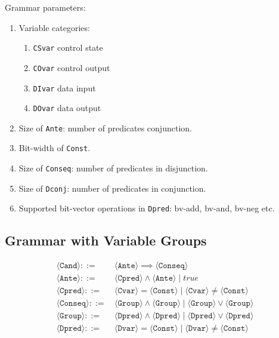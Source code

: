 \documentclass[10pt,conference]{article}
\numberwithin{equation}{section}
\newcommand{\tuple}[1]{\langle #1 \rangle}
\begin{document}
Grammar parameters:

\begin{enumerate}
\item Variable categories:
  \begin{enumerate}
    \item \texttt{CSvar} control state
    \item \texttt{COvar} control output
    \item \texttt{DIvar} data input
    \item \texttt{DOvar} data output
  \end{enumerate}
\item Size of \texttt{Ante}: number of predicates conjunction.
\item Bit-width of \texttt{Const}.
\item Size of \texttt{Conseq}: number of predicates in disjunction.
\item Size of \texttt{Dconj}: number of predicates in conjunction.
\item Supported bit-vector operations in \texttt{Dpred}: bv-add, bv-and, bv-neg etc.
\end{enumerate}



\subsection{Grammar with Variable Groups}

\begin{align}
\tuple{\texttt{Cand}} ::=\, & \tuple{\texttt{Ante}} \implies \tuple{\texttt{Conseq}} \\
\tuple{\texttt{Ante}} ::=\, & \tuple{\texttt{Cpred}} \land \tuple{\texttt{Ante}} \mid true\\
\tuple{\texttt{Cpred}} ::=\, & \tuple{\texttt{Cvar}} = \tuple{\texttt{Const}} \mid \tuple{\texttt{Cvar}} \neq \tuple{\texttt{Const}} \\
\tuple{\texttt{Conseq}} ::=\, & \tuple{\texttt{Group}}  \land \tuple{\texttt{Group}} \mid \tuple{\texttt{Group}} \lor \tuple{\texttt{Group}} \\
\tuple{\texttt{Group}} ::=\, & \tuple{\texttt{Dpred}} \land \tuple{\texttt{Dpred}} \mid \tuple{\texttt{Dpred}} \lor \tuple{\texttt{Dpred}} \\
\tuple{\texttt{Dpred}} ::=\, & \tuple{\texttt{Dvar}} = \tuple{\texttt{Const}} \mid \tuple{\texttt{Dvar}} \neq \tuple{\texttt{Const}}
\end{align}
\end{document}
